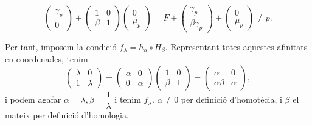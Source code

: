 \documentclass[11pt]{article}
\begin{document}
\begin{enumerate}
\begin{itemize}
\[\begin{pmatrix}
		\gamma_p\\ 0
		\end{pmatrix}+\begin{pmatrix}
		1&0\\ \beta&1\end{pmatrix}\begin{pmatrix}
		0\\ \mu_p
		\end{pmatrix}		
		=F+\begin{pmatrix}
		\gamma_p\\ \beta\gamma_p
		\end{pmatrix}+\begin{pmatrix}
		0\\ \mu_p
		\end{pmatrix}\neq p.
		\]
	\end{itemize}
	
	Per tant, imposem la condició $f_{\lambda}=h_{\alpha}\circ H_{\beta}$. Representant totes aquestes afinitats en coordenades, tenim	
	\[
	\begin{pmatrix}
	\lambda&0\\ 1&\lambda
	\end{pmatrix}=\begin{pmatrix}
	\alpha&0\\
	0&\alpha
	\end{pmatrix}\begin{pmatrix}
	1&0\\
	\beta&1
	\end{pmatrix}=\begin{pmatrix}
	\alpha&0\\
	\alpha\beta&\alpha
	\end{pmatrix},
	\]
	i podem agafar $\alpha=\lambda,\beta=\dfrac{1}{\lambda}$ i tenim $f_{\lambda}$. $\alpha\neq0$ per definició d'homotècia, i $\beta$ el mateix per definició d'homologia.
\end{enumerate}
\end{document}
